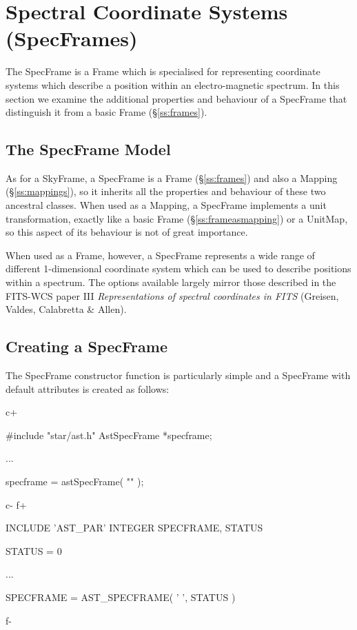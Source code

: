 \documentclass[twoside,11pt]{starlink}
\providecommand{\secref}[1]{\S\ref{#1}}
\begin{document}
\cleardoublepage
\section{\label{ss:specframes}Spectral Coordinate Systems (SpecFrames)}

The SpecFrame is a Frame which is specialised for representing coordinate
systems which describe a position within an electro-magnetic spectrum.
In this section we examine the additional properties and behaviour of a
SpecFrame that distinguish it from a basic Frame (\secref{ss:frames}).

\subsection{The SpecFrame Model}

As for a SkyFrame, a SpecFrame is a Frame (\secref{ss:frames}) and also a
Mapping (\secref{ss:mappings}), so it inherits all the properties and
behaviour of these two ancestral classes.  When used as a Mapping, a
SpecFrame implements a unit transformation, exactly like a basic Frame
(\secref{ss:frameasmapping}) or a UnitMap, so this aspect of its
behaviour is not of great importance.

When used as a Frame, however, a SpecFrame represents a wide range of
different 1-dimensional coordinate system which can be used to describe
positions within a spectrum. The options available largely mirror those
described in the FITS-WCS paper III \emph{Representations of spectral
coordinates in FITS} (Greisen, Valdes, Calabretta \& Allen).

\subsection{Creating a SpecFrame}

The SpecFrame constructor function is particularly simple and a
SpecFrame with default attributes is created as follows:

c+
\small
\begin{terminalv}
#include "star/ast.h"
AstSpecFrame *specframe;

...

specframe = astSpecFrame( "" );
\end{terminalv}
\normalsize
c-
f+
\small
\begin{terminalv}
      INCLUDE 'AST_PAR'
      INTEGER SPECFRAME, STATUS

      STATUS = 0

      ...

      SPECFRAME = AST_SPECFRAME( ' ', STATUS )
\end{terminalv}
\normalsize
f-
\end{document}
